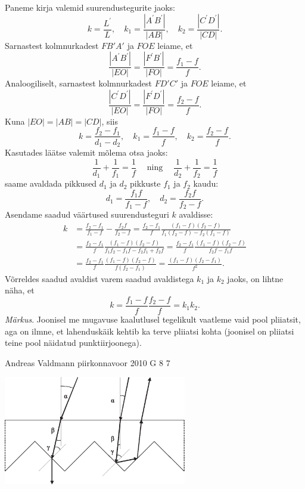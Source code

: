 \documentclass[11pt, twoside]{article}
\begin{document}
{{Paneme kirja valemid suurendustegurite jaoks:
\[
k=\frac{L^{\prime}}{L}, \quad k_{1}=\frac{|A^{\prime}B^{\prime}|}{|AB|}, \quad k_{2}=\frac{|C^{\prime}D^{\prime}|}{|CD|}.
\]
Sarnastest kolmnurkadest $FB'A'$ ja $FOE$ leiame, et
\[
\frac{|A^{\prime}B^{\prime}|}{|EO|}=\frac{|F^{\prime}B^{\prime}|}{|FO|}=\frac{f_{1}-f}{f}.
\]
Analoogiliselt, sarnastest kolmnurkadest $FD'C'$ ja $FOE$ leiame, et
\[
\frac{|C^{\prime}D^{\prime}|}{|EO|}=\frac{|F^{\prime}D^{\prime}|}{|FO|}=\frac{f_{2}-f}{f}.
\]
Kuna $|EO| = |AB| = |CD|$, siis
\[
k=\frac{f_{2}-f_{1}}{d_{1}-d_{2}}, \quad k_{1}=\frac{f_{1}-f}{f}, \quad k_{2}=\frac{f_{2}-f}{f}.
\]
Kasutades läätse valemit mõlema otsa jaoks:
\[
\frac{1}{d_{1}}+\frac{1}{f_{1}}=\frac{1}{f} \quad \operatorname{ning} \quad \frac{1}{d_{2}}+\frac{1}{f_{2}}=\frac{1}{f}
\]
saame avaldada pikkused $d_1$ ja $d_2$ pikkuste $f_1$ ja $f_2$ kaudu:
\[
d_{1}=\frac{f_{1} f}{f_{1}-f}, \quad d_{2}=\frac{f_{2} f}{f_{2}-f}.
\]
Asendame saadud väärtused suurendusteguri $k$ avaldisse:
\[
\begin{aligned}
	k&=\frac{f_{2}-f_{1}}{f_{1}-f}-\frac{f_{2} f}{f_{2}-f}=\frac{f_{2}-f_{1}}{f} \frac{\left(f_{1}-f\right)\left(f_{2}-f\right)}{f_{1}\left(f_{2}-f\right)-f_{2}\left(f_{1}-f\right)} \\ 
	&=\frac{f_{2}-f_{1}}{f} \frac{\left(f_{1}-f\right)\left(f_{2}-f\right)}{f_{1} f_{2}-f_{1} f-f_{2} f_{1}+f_{2} f}=\frac{f_{2}-f_{1}}{f} \frac{\left(f_{1}-f\right)\left(f_{2}-f\right)}{f_{2} f-f_{1} f} \\ &=\frac{f_{2}-f_{1}}{f} \frac{\left(f_{1}-f\right)\left(f_{2}-f\right)}{f\left(f_{2}-f_{1}\right)}=\frac{\left(f_{1}-f\right)\left(f_{2}-f_{1}\right)}{f^{2}}.
\end{aligned}
\]
Võrreldes saadud avaldist varem saadud avaldistega $k_1$ ja $k_2$ jaoks, on lihtne näha, et
\[
k=\frac{f_{1}-f}{f} \frac{f_{2}-f}{f}=k_{1} k_{2}.
\]
\emph{Märkus}. Joonisel me mugavuse kaalutlusel tegelikult vaatleme vaid pool pliiatsit, aga on ilmne, et lahenduskäik kehtib ka terve pliiatsi kohta (joonisel on pliiatsi teine pool näidatud punktiirjoonega).
\fi
}

{Andreas Valdmann} %
{piirkonnavoor} %
{2010} %
{G 8} %
{7} %
{

\ifSolution
\begin{center}
	\includegraphics[width=0.6\textwidth]{2010-v2g-08-hajuti_lah.eps}
\end{center}

}}
\end{document}
